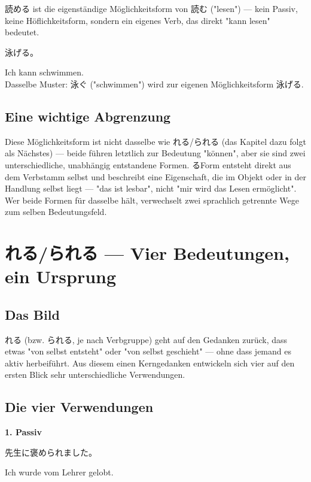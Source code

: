\documentclass[12pt]{book}
\begin{document}
読める ist die eigenständige Möglichkeitsform von 読む ("lesen") — kein Passiv, keine Höflichkeitsform, sondern ein eigenes Verb, das direkt "kann lesen" bedeutet.

\par\quad 泳げる。\\
\par\quad Ich kann schwimmen.\\

Dasselbe Muster: 泳ぐ ("schwimmen") wird zur eigenen Möglichkeitsform 泳げる.

\section*{Eine wichtige Abgrenzung}

Diese Möglichkeitsform ist nicht dasselbe wie れる/られる (das Kapitel dazu folgt als Nächstes) — beide führen letztlich zur Bedeutung "können", aber sie sind zwei unterschiedliche, unabhängig entstandene Formen. るForm entsteht direkt aus dem Verbstamm selbst und beschreibt eine Eigenschaft, die im Objekt oder in der Handlung selbst liegt — "das ist lesbar", nicht "mir wird das Lesen ermöglicht". Wer beide Formen für dasselbe hält, verwechselt zwei sprachlich getrennte Wege zum selben Bedeutungsfeld.


\chapter{れる/られる — Vier Bedeutungen, ein Ursprung}

\section*{Das Bild}

れる (bzw. られる, je nach Verbgruppe) geht auf den Gedanken zurück, dass etwas "von selbst entsteht" oder "von selbst geschieht" — ohne dass jemand es aktiv herbeiführt. Aus diesem einen Kerngedanken entwickeln sich vier auf den ersten Blick sehr unterschiedliche Verwendungen.

\section*{Die vier Verwendungen}

\textbf{1. Passiv}
\par\quad 先生に褒められました。\\
\par\quad Ich wurde vom Lehrer gelobt.\\
\end{document}
